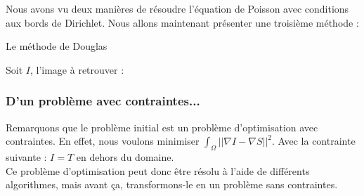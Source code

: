 Nous avons vu deux manières de résoudre l'équation de Poisson avec conditions aux bords de Dirichlet. Nous allons maintenant présenter une troisième méthode  : \\
\begin{center}
Le méthode de Douglas
\end{center}
Soit $I$, l'image à retrouver : 
\subsubsection{D'un problème avec contraintes...}
Remarquons que le problème initial est un problème d'optimisation avec contraintes. En effet, nous voulons minimiser $\int_\Omega ||\nabla I-\nabla S||^2$. Avec la contrainte suivante : $I = T$ en dehors du domaine. \\
Ce problème d'optimisation peut donc être résolu à l'aide de différents algorithmes, mais avant ça, transformons-le en un problème sans contraintes. 

